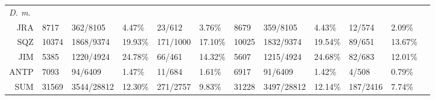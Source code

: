 \documentclass[a4paper,8pt]{article}
\begin{document}
\begin{table}[]
\begin{adjustwidth}{-1.45in}{0in}
\begin{tabular}{llllllllllll}
\bottomrule
 \multicolumn{1}{l|}{\emph{D. m.}} & \multicolumn{10}{l}{} \\
 \multicolumn{1}{r|}{JRA} & 8717 & 362/8105 & 4.47\% & 23/612 & 3.76\% & \multicolumn{1}{|l}{8679} & 359/8105 & 4.43\% & 12/574 & 2.09\% & \\ 
\multicolumn{1}{r|}{SQZ} & 10374 & 1868/9374 & 19.93\% & 171/1000 & 17.10\% & \multicolumn{1}{|l}{10025} & 1832/9374 & 19.54\% & 89/651 & 13.67\% & \\ 
\multicolumn{1}{r|}{JIM} & 5385 & 1220/4924 & 24.78\% & 66/461 & 14.32\% & \multicolumn{1}{|l}{5607} & 1215/4924 & 24.68\% & 82/683 & 12.01\% & \\ 
\multicolumn{1}{r|}{ANTP} & 7093 & 94/6409 & 1.47\% & 11/684 & 1.61\% & \multicolumn{1}{|l}{6917} & 91/6409 & 1.42\% & 4/508 & 0.79\% & \\ 
\midrule\multicolumn{1}{r|}{SUM} & 31569 & 3544/28812 & 12.30\% & 271/2757 & 9.83\% & \multicolumn{1}{|l}{31228} & 3497/28812 & 12.14\% & 187/2416 & 7.74\% & \\ 

\bottomrule
\end{tabular}
\end{adjustwidth}
\end{table}
\end{document}

